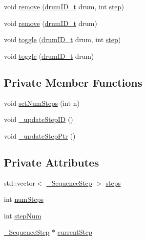 \begin{DoxyCompactItemize}
\item 
void \hyperlink{classdrumpi_1_1Sequencer_a5b9b8acf415b43f72442f0a591054412}{remove} (\hyperlink{namespacedrumpi_a3897274035c1b939a604438abe648b1b}{drum\+I\+D\+\_\+t} drum, int \hyperlink{classdrumpi_1_1Sequencer_a86e0af4260c526be4646ce343830e6c4}{step})
\item 
void \hyperlink{classdrumpi_1_1Sequencer_ad7fcb2041b2b68133def003eef420f99}{remove} (\hyperlink{namespacedrumpi_a3897274035c1b939a604438abe648b1b}{drum\+I\+D\+\_\+t} drum)
\item 
void \hyperlink{classdrumpi_1_1Sequencer_a2d7b85fe97bd2714632bd65135868897}{toggle} (\hyperlink{namespacedrumpi_a3897274035c1b939a604438abe648b1b}{drum\+I\+D\+\_\+t} drum, int \hyperlink{classdrumpi_1_1Sequencer_a86e0af4260c526be4646ce343830e6c4}{step})
\item 
void \hyperlink{classdrumpi_1_1Sequencer_a7ca8d490e9eaf703c9f7e0594fa4090c}{toggle} (\hyperlink{namespacedrumpi_a3897274035c1b939a604438abe648b1b}{drum\+I\+D\+\_\+t} drum)
\end{DoxyCompactItemize}
\subsection*{Private Member Functions}
\begin{DoxyCompactItemize}
\item 
void \hyperlink{classdrumpi_1_1Sequencer_adf7a6603073c345b72805211f87d5d1c}{set\+Num\+Steps} (int n)
\item 
void \hyperlink{classdrumpi_1_1Sequencer_a55a080037b948534ef6fab28ee3cf8e1}{\+\_\+update\+Step\+ID} ()
\item 
void \hyperlink{classdrumpi_1_1Sequencer_a3d07f2cafd5fc311aa05e049685756e4}{\+\_\+update\+Step\+Ptr} ()
\end{DoxyCompactItemize}
\subsection*{Private Attributes}
\begin{DoxyCompactItemize}
\item 
std\+::vector$<$ \hyperlink{classdrumpi_1_1__SequenceStep}{\+\_\+\+Sequence\+Step} $>$ \hyperlink{classdrumpi_1_1Sequencer_a756f8ef45e87ef2165d7e34752c9bf7e}{steps}
\item 
int \hyperlink{classdrumpi_1_1Sequencer_a0e4963cb16a4c6cbeb85838199c1bb8e}{num\+Steps}
\item 
int \hyperlink{classdrumpi_1_1Sequencer_a259a1eb2adc67dc949c2cdb45358886d}{step\+Num}
\item 
\hyperlink{classdrumpi_1_1__SequenceStep}{\+\_\+\+Sequence\+Step} $\ast$ \hyperlink{classdrumpi_1_1Sequencer_a0bf12baf6bf923324df41f1ea784ba99}{current\+Step}
\end{DoxyCompactItemize}


